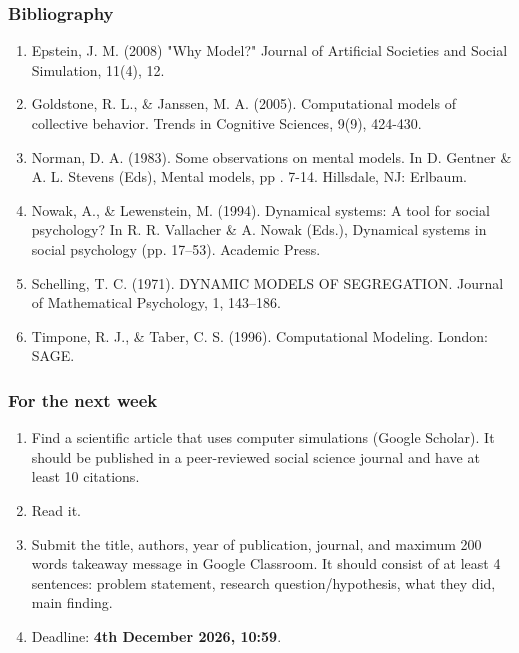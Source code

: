 \documentclass[aspectratio=169]{beamer}
\begin{document}
\begin{frame}
   \frametitle{Bibliography}
   \scriptsize
   \begin{enumerate}
      \item Epstein, J. M. (2008) "Why Model?" Journal of Artificial Societies and Social Simulation, 11(4), 12.
      \item Goldstone, R. L., \& Janssen, M. A. (2005). Computational models of collective behavior. Trends in Cognitive Sciences, 9(9), 424-430.
      \item Norman, D. A. (1983). Some observations on mental models. In D. Gentner \& A. L. Stevens (Eds), Mental models, pp . 7-14. Hillsdale, NJ: Erlbaum.
      \item Nowak, A., \& Lewenstein, M. (1994). Dynamical systems: A tool for social psychology? In R. R. Vallacher \& A. Nowak (Eds.), Dynamical systems in social psychology (pp. 17–53). Academic Press.
      \item Schelling, T. C. (1971). DYNAMIC MODELS OF SEGREGATION. Journal of
      Mathematical Psychology, 1, 143–186.
      \item Timpone, R. J., \& Taber, C. S. (1996). Computational Modeling. London: SAGE.
   \end{enumerate}
\end{frame}

\begin{frame}
    \frametitle{For the next week}
    \begin{enumerate}
        \item Find a scientific article that uses computer simulations (Google Scholar). It should be published in a peer-reviewed social science journal and have at least 10 citations.
        \item Read it.
        \item Submit the title, authors, year of publication, journal, and maximum 200 words takeaway message in Google Classroom. It should consist of at least 4 sentences: problem statement, research question/hypothesis, what they did, main finding.
        \item Deadline: \textbf{4th December 2026, 10:59}.
    \end{enumerate}
\end{frame}
\end{document}
